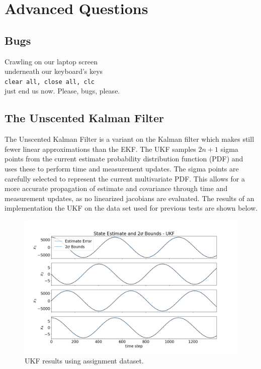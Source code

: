 \documentclass[11pt, a4paper]{article}
\begin{document}
\newpage

\section*{Advanced Questions}
\subsection{Bugs}
Crawling on our laptop screen \\
underneath our keyboard's keys \\
\texttt{clear all, close all, clc} \\
just end us now. Please, bugs, please. \\
 
\subsection{The Unscented Kalman Filter}
The Unscented Kalman Filter is a variant on the Kalman filter which makes still fewer linear approximations than the EKF. 
The UKF samples $2n+1$ sigma points from the current estimate probability distribution function (PDF) and uses these to perform time and measurement updates.
The sigma points are carefully selected to represent the current multivariate PDF. 
This allows for a more accurate propagation of estimate and covariance through time and measurement updates, as no linearized jacobians are evaluated. 
The results of an implementation the UKF on the data set used for previous tests are shown below.

\begin{figure}[H]
	\centering
	\includegraphics[width=\textwidth]{Figures/ukf_dataset_est.png}
	\caption{UKF results using assignment dataset.}
	\label{fig:ukf_dataset}
\end{figure}
\end{document}
